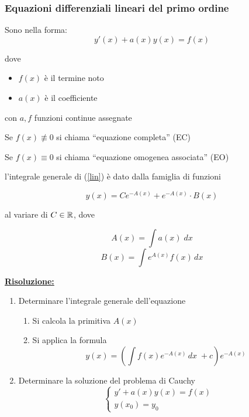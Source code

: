 \subsubsection{Equazioni differenziali lineari del primo ordine}
Sono nella forma:
\begin{equation}
    y'(x) + a(x)y(x) =f(x)
    \label{lin}
\end{equation}

dove
\begin{itemize}
    \item $f(x)$ è il termine noto
    \item $a(x)$ è il coefficiente
\end{itemize}

con $a, f$ funzioni continue assegnate
\vspace*{\baselineskip}

Se $f(x) \not\equiv 0$ si chiama “equazione completa” (EC)

Se $f(x) \equiv 0$ si chiama “equazione omogenea associata” (EO)

\begin{theorem}
    l’integrale generale di \textnormal{(\ref{lin})} è dato dalla famiglia di funzioni

    \begin{equation}
            y(x) = Ce^{-A(x)} + e^{-A(x)}\cdot B(x)
    \end{equation}

    al variare di $C \in \mathbb{R}$, dove
    
    \begin{equation}
        A(x) = \int a(x) \; dx
    \end{equation}
    \begin{equation}
        B(x) = \int e^{A(x)}f(x) \, dx
    \end{equation}
\end{theorem}

\underline{\textbf{Risoluzione:}}
\begin{enumerate}
    \item Determinare l’integrale generale dell’equazione
    \begin{enumerate}
        \item Si calcola la primitiva $A(x)$
        \item Si applica la formula
        \begin{equation}
            y(x) = \left( \int f(x)e^{-A(x)}\, dx \; + c \right)e^{-A(x)}
        \end{equation}
    \end{enumerate}

    \item Determinare la soluzione del problema di Cauchy 
    \begin{equation}
        \begin{cases}
            y' + a(x)y(x) = f(x) \\
            y(x_0) = y_0
        \end{cases}
    \end{equation}
\end{enumerate}

